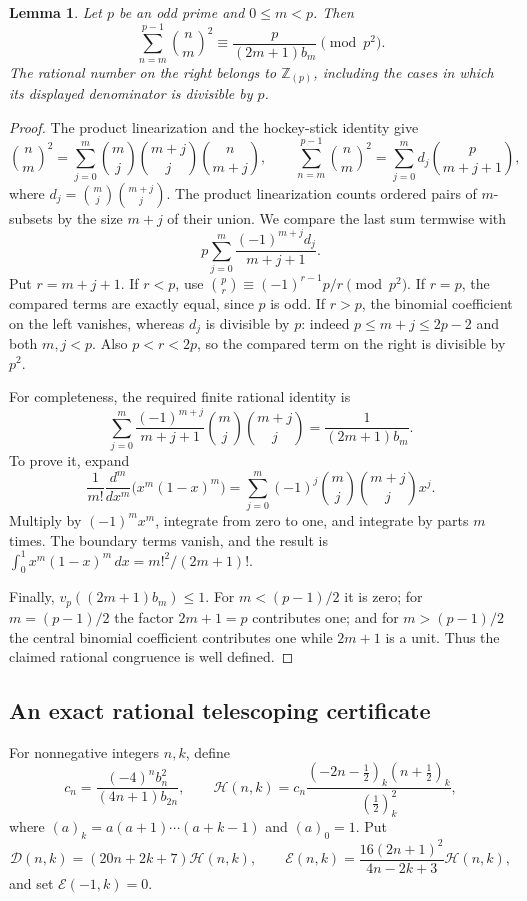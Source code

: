 \documentclass[11pt,a4paper]{article}
\newtheorem{lemma}[theorem]{Lemma}
\theoremstyle{remark}\newtheorem{remark}[theorem]{Remark}
\newcommand{\Z}{\mathbb Z}\newcommand{\Q}{\mathbb Q}
\begin{document}
\begin{lemma}\label{p2:inner}
Let \(p\) be an odd prime and \(0\le m<p\). Then
\[
 \sum_{n=m}^{p-1}\binom nm^2
 \equiv \frac{p}{(2m+1)b_m}\pmod{p^2}.
\]
The rational number on the right belongs to \(\Z_{(p)}\), including
the cases in which its displayed denominator is divisible by \(p\).
\end{lemma}
\begin{proof}
The product linearization and the hockey-stick identity give
\[
 \binom nm^2=\sum_{j=0}^m
   \binom mj\binom{m+j}{j}\binom n{m+j},
\qquad
 \sum_{n=m}^{p-1}\binom nm^2
 =\sum_{j=0}^m d_j\binom p{m+j+1},
\]
where \(d_j=\binom mj\binom{m+j}{j}\).
The product linearization counts ordered pairs of \(m\)-subsets by
the size \(m+j\) of their union.
We compare the last sum termwise with
\[
             p\sum_{j=0}^m\frac{(-1)^{m+j}d_j}{m+j+1}.
\]
Put \(r=m+j+1\). If \(r<p\), use
\(\binom pr\equiv(-1)^{r-1}p/r\pmod{p^2}\).
If \(r=p\), the compared terms are exactly equal, since \(p\) is odd.
If \(r>p\), the binomial coefficient on the left vanishes,
whereas \(d_j\) is divisible by \(p\): indeed
\(p\le m+j\le2p-2\) and both \(m,j<p\). Also \(p<r<2p\), so the
compared term on the right is divisible by \(p^2\).

For completeness, the required finite rational identity is
\[
 \sum_{j=0}^m\frac{(-1)^{m+j}}{m+j+1}
                 \binom mj\binom{m+j}{j}
          =\frac1{(2m+1)b_m}.
\]
To prove it, expand
\[
 \frac1{m!}\frac{d^m}{dx^m}\bigl(x^m(1-x)^m\bigr)
       =\sum_{j=0}^m(-1)^j\binom mj\binom{m+j}{j}x^j.
\]
Multiply by \((-1)^mx^m\), integrate from zero to one, and integrate
by parts \(m\) times. The boundary terms vanish, and the result is
\(\int_0^1x^m(1-x)^m\,dx=m!^2/(2m+1)!\).

Finally, \(v_p((2m+1)b_m)\le1\). For \(m<(p-1)/2\) it is zero;
for \(m=(p-1)/2\) the factor \(2m+1=p\) contributes one; and for
\(m>(p-1)/2\) the central binomial coefficient contributes one while
\(2m+1\) is a unit. Thus the claimed rational congruence is well defined.
\end{proof}

\subsection{An exact rational telescoping certificate}

For nonnegative integers \(n,k\), define
\[
 c_n=\frac{(-4)^n b_n^2}{(4n+1)b_{2n}},\qquad
 \mathcal H(n,k)=c_n
       \frac{(-2n-\tfrac12)_k(n+\tfrac12)_k}{(\tfrac12)_k^2},
\]
where \((a)_k=a(a+1)\cdots(a+k-1)\) and \((a)_0=1\). Put
\[
 \mathcal D(n,k)=(20n+2k+7)\mathcal H(n,k),\qquad
 \mathcal E(n,k)=\frac{16(2n+1)^2}{4n-2k+3}\mathcal H(n,k),
\]
and set \(\mathcal E(-1,k)=0\).
\end{document}
